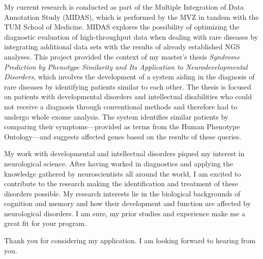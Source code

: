 \documentclass[11pt,a4paper,sans]{moderncv} %
\newcommand{\showcv}{}
\begin{document}
	My current research is conducted as part of the Multiple Integration of Data Annotation Study (MIDAS), which is performed by the MVZ in tandem with the TUM School of Medicine.
	MIDAS explores the possibility of optimizing the diagnostic evaluation of high-throughput data when dealing with rare diseases by integrating additional data sets with the results of already established NGS analyses.
	This project provided the context of my master's thesis \textit{Syndrome Prediction by Phenotype Similarity and Its Application to Neurodevelopmental Disorders}, which involves the development of a system aiding in the diagnosis of rare diseases by identifying patients similar to each other.
	The thesis is focused on patients with developmental disorders and intellectual disabilities who could not receive a diagnosis through conventional methods and therefore had to undergo whole exome analysis.
	The system identifies similar patients by comparing their symptoms---provided as terms from the Human Phenotype Ontology---and suggests affected genes based on the results of these queries.
	
	My work with developmental and intellectual disorders piqued my interest in neurological science.
	After having worked in diagnostics and applying the knowledge gathered by neuroscientists all around the world, I am excited to contribute to the research making the identification and treatment of these disorders possible.
	My research interests lie in the biological backgrounds of cognition and memory and how their development and function are affected by neurological disorders. 
	I am sure, my prior studies and experience make me a great fit for your program.
	
	Thank you for considering my application.
	I am looking forward to hearing from you.
	
	\makeletterclosing %
	
	
	\fi
	\ifdefined\showcv
	\newpage
	\makecvtitle %
	
	\vspace{-20pt}
	
\end{document}
